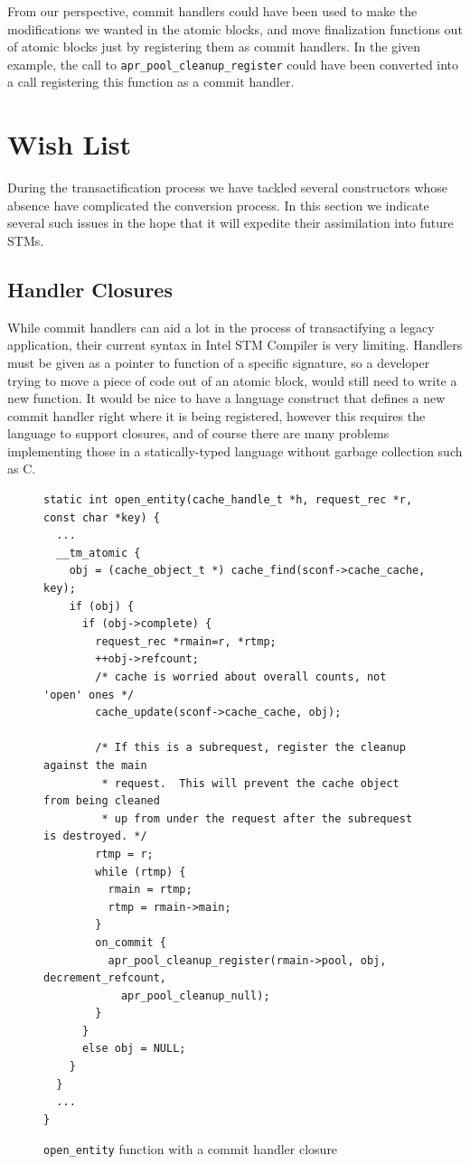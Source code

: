 \documentclass[preprint,11pt]{sigplanconf}
\begin{document}
From our perspective, commit handlers could have been used to make the
modifications we wanted in the atomic blocks, and move finalization functions
out of atomic blocks just by registering them as commit handlers. In the given
example, the call to {\tt apr\_pool\_cleanup\_register} could have been
converted into a call registering this function as a commit handler. 


\section{Wish List}\label{sec:wishlist}
During the transactification process we have tackled several constructors  
whose absence have complicated the conversion process. In this section we
indicate several such issues in the hope that it will expedite their 
assimilation into future STMs.

\subsection{Handler Closures}
While commit handlers can aid a lot in the process of transactifying a legacy
application, their current syntax in Intel STM Compiler is very limiting.
Handlers must be given as a pointer to function of a specific signature, so a
developer trying to move a piece of code out of an atomic block, would still
need to write a new function. It would be nice to have a language construct that
defines a new commit handler right where it is being registered, however this
requires the language to support closures, and of course there are many problems
implementing those in a statically-typed language without garbage collection
such as C.

\begin{figure}
\begin{lstlisting}
static int open_entity(cache_handle_t *h, request_rec *r, const char *key) {
  ...
  __tm_atomic {
    obj = (cache_object_t *) cache_find(sconf->cache_cache, key);
    if (obj) {
      if (obj->complete) {
        request_rec *rmain=r, *rtmp;
        ++obj->refcount;
        /* cache is worried about overall counts, not 'open' ones */
        cache_update(sconf->cache_cache, obj);

        /* If this is a subrequest, register the cleanup against the main
         * request.  This will prevent the cache object from being cleaned
         * up from under the request after the subrequest is destroyed. */
        rtmp = r;
        while (rtmp) {
          rmain = rtmp;
          rtmp = rmain->main;
        }
        on_commit {
          apr_pool_cleanup_register(rmain->pool, obj, decrement_refcount, 
            apr_pool_cleanup_null);
        }
      }
      else obj = NULL;
    }
  }
  ...
}
\end{lstlisting}
\caption{{\tt open\_entity} function with a commit handler closure}
\label{code:closure-open-entity}
\end{figure}
\end{document}
